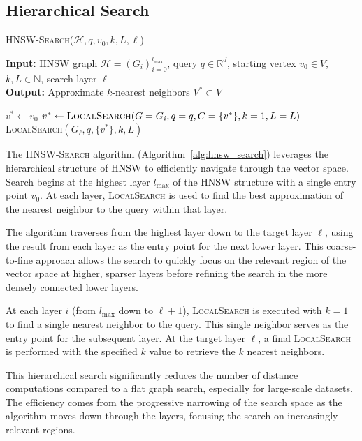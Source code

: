 \documentclass{article}
\begin{document}
\subsection{Hierarchical Search}
\label{subasec: hnsw-search}

\begin{algorithm}
\caption{\textsc{HNSW-Search}($\mathcal{H}, q, v_0, k, L, \ell$)}\label{alg:hnsw_search}
\textbf{Input:} HNSW graph $\mathcal{H} = (G_i)_{i=0}^{l_{\max}}$, query $q \in \mathbb{R}^d$, starting vertex $v_0 \in V$, $k, L \in \mathbb{N}$, search layer $\ell$ \\
\textbf{Output:} Approximate $k$-nearest neighbors $V^* \subset V$
\begin{algorithmic}[1]
\State $v^* \gets v_0$ 
    \State $v^* \gets \textsc{LocalSearch}(G=G_i, q=q, C=\{v^*\}, k=1, L=L)$
\EndFor
\State \Return \textsc{LocalSearch}$(G_\ell, q, \{v^*\}, k, L)$
\end{algorithmic}
\end{algorithm}

The \textsc{HNSW-Search} algorithm (Algorithm~\ref{alg:hnsw_search}) leverages the hierarchical structure of HNSW to efficiently navigate through the vector space. Search begins at the highest layer $l_{\max}$ of the HNSW structure with a single entry point $v_0$. At each layer, \textsc{LocalSearch} is used to find the best approximation of the nearest neighbor to the query within that layer.

The algorithm traverses from the highest layer down to the target layer $\ell$, using the result from each layer as the entry point for the next lower layer. This coarse-to-fine approach allows the search to quickly focus on the relevant region of the vector space at higher, sparser layers before refining the search in the more densely connected lower layers.

At each layer $i$ (from $l_{\max}$ down to $\ell+1$), \textsc{LocalSearch} is executed with $k=1$ to find a single nearest neighbor to the query. This single neighbor serves as the entry point for the subsequent layer. At the target layer $\ell$, a final \textsc{LocalSearch} is performed with the specified $k$ value to retrieve the $k$ nearest neighbors.

This hierarchical search significantly reduces the number of distance computations compared to a flat graph search, especially for large-scale datasets. The efficiency comes from the progressive narrowing of the search space as the algorithm moves down through the layers, focusing the search on increasingly relevant regions.
\end{document}
